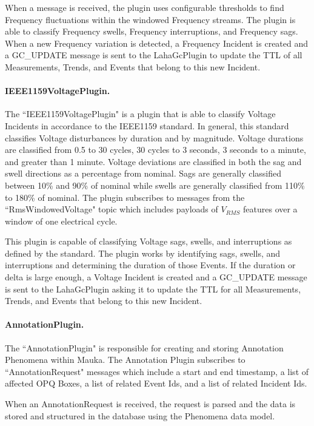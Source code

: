 When a message is received, the plugin uses configurable thresholds to find Frequency fluctuations within the windowed Frequency streams. The plugin is able to classify Frequency swells, Frequency interruptions, and Frequency sags. When a new Frequency variation is detected, a Frequency Incident is created and a GC\_UPDATE message is sent to the LahaGcPlugin to update the TTL of all Measurements, Trends, and Events that belong to this new Incident.

\paragraph{IEEE1159VoltagePlugin.}
The ``IEEE1159VoltagePlugin" is a plugin that is able to classify Voltage Incidents in accordance to the IEEE1159 standard\cite{IEEE:2018:1159D3}. In general, this standard classifies Voltage disturbances by duration and by magnitude. Voltage durations are classified from 0.5 to 30 cycles, 30 cycles to 3 seconds, 3 seconds to a minute, and greater than 1 minute. Voltage deviations are classified in both the sag and swell directions as a percentage from nominal. Sags are generally classified between 10\% and 90\% of nominal while swells are generally classified from 110\% to 180\% of nominal.  The plugin subscribes to messages from the ``RmsWindowedVoltage" topic which includes payloads of $V_{RMS}$ features over a window of one electrical cycle.

This plugin is capable of classifying Voltage sags, swells, and interruptions as defined by the standard. The plugin works by identifying sags, swells, and interruptions and determining the duration of those Events. If the duration or delta is large enough, a Voltage Incident is created and a GC\_UPDATE message is sent to the LahaGcPlugin asking it to update the TTL for all Measurements, Trends, and Events that belong to this new Incident.

\paragraph{AnnotationPlugin.}

The ``AnnotationPlugin" is responsible for creating and storing Annotation Phenomena within Mauka. The Annotation Plugin subscribes to ``AnnotationRequest" messages which include a start and end timestamp, a list of affected OPQ Boxes, a list of related Event Ids, and a list of related Incident Ids.

When an AnnotationRequest is received, the request is parsed and the data is stored and structured in the database using the Phenomena data model.

